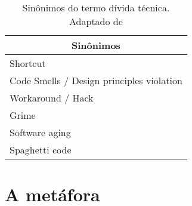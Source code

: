 \begin{table}[H]
\centering
\begin{tabular}{|l|}
\hline
\multicolumn{1}{|c|}{Sinônimos}                  \\ \hline
Shortcut                                   \\ \hline
Code Smells / Design principles violation                                \\ \hline
Workaround / Hack                          \\ \hline
Grime                                        \\ \hline
Software aging                                     \\ \hline
Spaghetti code                                        \\ \hline
\end{tabular}
\caption{Sinônimos do termo dívida técnica. Adaptado de \cite{poliakov2015systematic}}
\label{tab:tabela_sinonimos}
\end{table}

\section{A metáfora}

